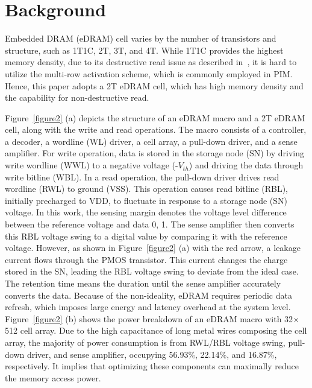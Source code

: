 

\section{Background}
\label{background}


Embedded DRAM (eDRAM) cell varies by the number of transistors and structure, such as 1T1C, 2T, 3T, and 4T. While 1T1C provides the highest memory density, due to its destructive read issue as described in~\cite{xie2022gain}, it is hard to utilize the multi-row activation scheme, which is commonly employed in PIM. Hence, this paper adopts a 2T eDRAM cell, which has high memory density and the capability for non-destructive read.


Figure~\ref{figure2} (a) depicts the structure of an eDRAM macro and a 2T eDRAM cell, along with the write and read operations. The macro consists of a controller, a decoder, a wordline (WL) driver, a cell array, a pull-down driver, and a sense amplifier. For write operation, data is stored in the storage node (SN) by driving write wordline (WWL) to a negative voltage (-$V_{th}$) and driving the data through write bitline (WBL). In a read operation, the pull-down driver drives read wordline (RWL) to ground (VSS). This operation causes read bitline (RBL), initially precharged to VDD, to fluctuate in response to a storage node (SN) voltage. In this work, the sensing margin denotes the voltage level difference between the reference voltage and data 0, 1. The sense amplifier then converts this RBL voltage swing to a digital value by comparing it with the reference voltage. However, as shown in  Figure~\ref{figure2} (a) with the red arrow, a leakage current flows through the PMOS transistor. This current changes the charge stored in the SN, leading the RBL voltage swing to deviate from the ideal case. The retention time means the duration until the sense amplifier accurately converts the data. Because of the non-ideality, eDRAM requires periodic data refresh, which imposes large energy and latency overhead at the system level. Figure~\ref{figure2} (b) shows the power breakdown of an eDRAM macro with 32$\times$512 cell array. Due to the high capacitance of long metal wires composing the cell array, the majority of power consumption is from RWL/RBL voltage swing, pull-down driver, and sense amplifier, occupying 56.93\%, 22.14\%, and 16.87\%, respectively. It implies that optimizing these components can maximally reduce the memory access power.